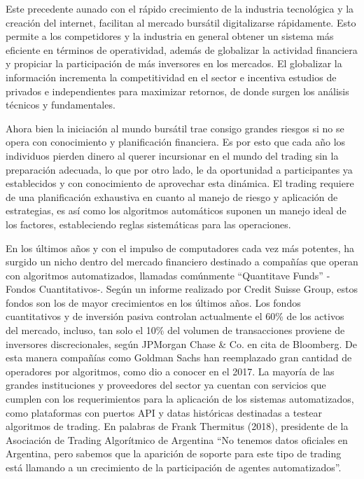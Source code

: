 \documentclass[a4paper,12pt]{Latex/Classes/PhDthesisPSnPDF}
\begin{document}
Este precedente aunado con el rápido crecimiento de la industria tecnológica y la creación del internet, facilitan al mercado bursátil digitalizarse rápidamente. Esto permite a los competidores y la industria en general obtener un sistema más eficiente en términos de operatividad, además de globalizar la actividad financiera y propiciar la participación de más inversores en los mercados. El globalizar la información incrementa la competitividad en el sector e incentiva estudios de privados e independientes para maximizar retornos, de donde surgen los análisis técnicos y fundamentales.

Ahora bien la iniciación al mundo bursátil trae consigo grandes riesgos si no se opera con conocimiento y planificación financiera. Es por esto que cada año los individuos pierden dinero al querer incursionar en el mundo del trading sin la preparación adecuada, lo que por otro lado, le da oportunidad a participantes ya establecidos y con conocimiento de aprovechar esta dinámica. El trading requiere de una planificación exhaustiva en cuanto al manejo de riesgo y aplicación de estrategias, es así como los algoritmos automáticos suponen un manejo ideal de los factores, estableciendo reglas sistemáticas para las operaciones.

En los últimos años y con el impulso de computadores cada vez más potentes, ha surgido un nicho dentro del mercado financiero destinado a compañías que operan con algoritmos automatizados, llamadas comúnmente “Quantitave Funds” -Fondos Cuantitativos-. Según un informe realizado por Credit Suisse Group, estos fondos son los de mayor crecimientos en los últimos años. Los fondos cuantitativos y de inversión pasiva controlan actualmente el 60\% de los activos del mercado, incluso, tan solo el 10\% del volumen de transacciones proviene de inversores discrecionales, según JPMorgan Chase \& Co. en cita de Bloomberg. De esta manera compañías como Goldman Sachs han reemplazado gran cantidad de operadores por algoritmos, como dio a conocer en el 2017. La mayoría de las grandes instituciones y proveedores del sector ya cuentan con servicios que cumplen con los requerimientos para la aplicación de los sistemas automatizados, como plataformas con puertos API y datas históricas destinadas a testear algoritmos de trading. En palabras de Frank Thermitus (2018), presidente de la Asociación de Trading Algorítmico de Argentina “No tenemos datos oficiales en Argentina, pero sabemos que la aparición de soporte para este tipo de trading está llamando a un crecimiento de la participación de agentes automatizados”.
\end{document}
